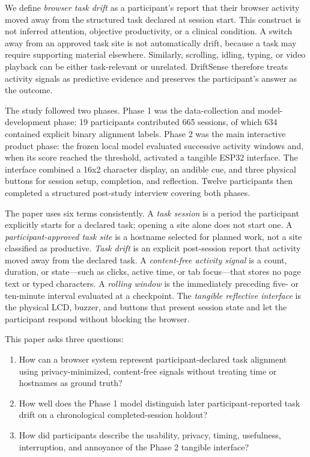 \documentclass[12pt,a4paper]{article}
\begin{document}
We define \emph{browser task drift} as a participant's report that their browser activity moved away from the structured task declared at session start. This construct is not inferred attention, objective productivity, or a clinical condition. A switch away from an approved task site is not automatically drift, because a task may require supporting material elsewhere. Similarly, scrolling, idling, typing, or video playback can be either task-relevant or unrelated. DriftSense therefore treats activity signals as predictive evidence and preserves the participant's answer as the outcome.

The study followed two phases. Phase 1 was the data-collection and model-development phase: 19 participants contributed 665 sessions, of which 634 contained explicit binary alignment labels. Phase 2 was the main interactive product phase: the frozen local model evaluated successive activity windows and, when its score reached the threshold, activated a tangible ESP32 interface. The interface combined a 16x2 character display, an audible cue, and three physical buttons for session setup, completion, and reflection. Twelve participants then completed a structured post-study interview covering both phases.

The paper uses six terms consistently. A \emph{task session} is a period the participant explicitly starts for a declared task; opening a site alone does not start one. A \emph{participant-approved task site} is a hostname selected for planned work, not a site classified as productive. \emph{Task drift} is an explicit post-session report that activity moved away from the declared task. A \emph{content-free activity signal} is a count, duration, or state---such as clicks, active time, or tab focus---that stores no page text or typed characters. A \emph{rolling window} is the immediately preceding five- or ten-minute interval evaluated at a checkpoint. The \emph{tangible reflective interface} is the physical LCD, buzzer, and buttons that present session state and let the participant respond without blocking the browser.

This paper asks three questions:

\begin{enumerate}[label=\textit{RQ\arabic*:},font=\itshape]
\item How can a browser system represent participant-declared task alignment using privacy-minimized, content-free signals without treating time or hostnames as ground truth?
\item How well does the Phase 1 model distinguish later participant-reported task drift on a chronological completed-session holdout?
\item How did participants describe the usability, privacy, timing, usefulness, interruption, and annoyance of the Phase 2 tangible interface?
\end{enumerate}
\end{document}
